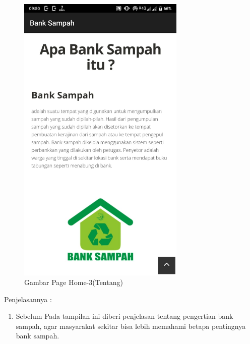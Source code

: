	\begin{figure}[H]
		\includegraphics[width=8cm]{figures/analisis/34.png}
		\centering
		\caption{Gambar Page Home-3(Tentang)}
	\end{figure}
Penjelasannya :
\begin{enumerate}
\item Sebelum Pada  tampilan ini diberi penjelasan tentang pengertian bank sampah, agar masyarakat sekitar bisa lebih memahami betapa pentingnya bank sampah.
\end{enumerate}

